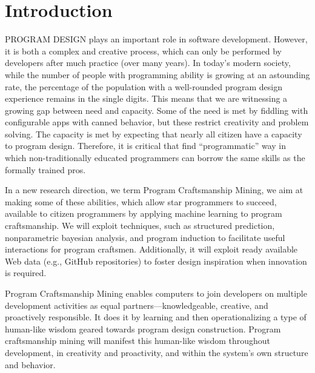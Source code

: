 \chapter{Introduction}{}
\label{sec:intro}

\lettrine[lraise=0.1, nindent=0em, slope=-.5em]{P}{ROGRAM DESIGN}  plays an 
important role in software development. However, it is both a complex and 
creative process, which can only be performed by developers after much 
practice (over many years). In today’s modern society, while the number of 
people with programming ability is growing at an astounding rate, the 
percentage of the population with a well-rounded program design experience 
remains in the single digits. This means that we are witnessing a growing gap 
between need and capacity. Some of the need is met by fiddling with configurable 
apps with canned behavior, but these restrict creativity and problem solving. The 
capacity is met by expecting that nearly all citizen have a capacity to program 
design. Therefore, it is critical that find ``programmatic'' way in which 
non-traditionally educated programmers can borrow the same skills as the formally 
trained pros.   


In a new research direction, we term Program Craftsmanship Mining, we aim at 
making some of these abilities, which allow star programmers to succeed, available 
to citizen programmers by applying machine learning to program craftsmanship. We 
will exploit techniques, such as structured prediction, nonparametric bayesian 
analysis, and program induction to facilitate useful interactions for program 
craftsmen. Additionally, it will exploit ready available Web data (e.g., GitHub 
repositories) to foster design inspiration when innovation is required.

Program Craftsmanship Mining enables computers to join developers on multiple 
development activities as equal partners—knowledgeable, creative, and proactively 
responsible. It does it by learning and then operationalizing a type of human-like 
wisdom geared towards program design construction.  Program craftsmanship mining will 
manifest this human-like wisdom throughout development, in creativity and 
proactivity, and within the system’s own structure and behavior. 
